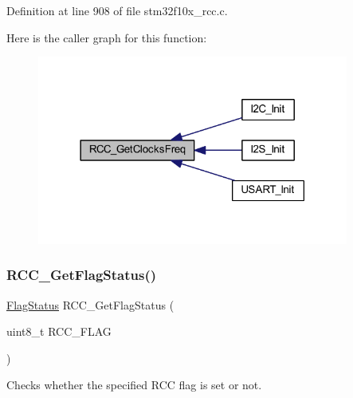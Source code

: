 Definition at line 908 of file stm32f10x\+\_\+rcc.\+c.

Here is the caller graph for this function\+:
\nopagebreak
\begin{figure}[H]
\begin{center}
\leavevmode
\includegraphics[width=290pt]{group___r_c_c___exported___functions_ga3e9944fd1ed734275222bbb3e3f29993_icgraph}
\end{center}
\end{figure}
\mbox{\label{group___r_c_c___exported___functions_ga2897bdc52f272031c44fb1f72205d295}} 
\subsubsection{\texorpdfstring{R\+C\+C\+\_\+\+Get\+Flag\+Status()}{RCC\_GetFlagStatus()}}
{\footnotesize\ttfamily \hyperlink{group___exported__types_ga89136caac2e14c55151f527ac02daaff}{Flag\+Status} R\+C\+C\+\_\+\+Get\+Flag\+Status (\begin{DoxyParamCaption}\item[{uint8\+\_\+t}]{R\+C\+C\+\_\+\+F\+L\+AG }\end{DoxyParamCaption})}



Checks whether the specified R\+CC flag is set or not. 


